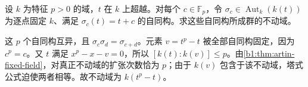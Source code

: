 \begin{exercise}\label{b1:ex:19-translation-fixed-field}
	设 \(k\) 为特征 \(p>0\) 的域，\(t\) 在 \(k\) 上超越。对每个 \(c\in\mathbb F_p\)，令 \(\sigma_c\in\operatorname{Aut}_k(k(t))\) 为逐点固定 \(k\)、满足 \(\sigma_c(t)=t+c\) 的自同构。求这些自同构所成群的不动域。
\end{exercise}
\begin{solution}
	这 \(p\) 个自同构互异，且 \(\sigma_c\sigma_d=\sigma_{c+d}\)。元素 \(v=t^p-t\) 被全部自同构固定，因为 \(c^p=c\)。又 \(t\) 满足 \(x^p-x-v=0\)，所以 \([k(t):k(v)]\leq p\)。由\cref{b1:thm:artin-fixed-field}，对真正不动域的扩张次数恰为 \(p\)；由于 \(k(v)\) 包含于该不动域，塔式公式迫使两者相等。故不动域为 \(k(t^p-t)\)。
\end{solution}
